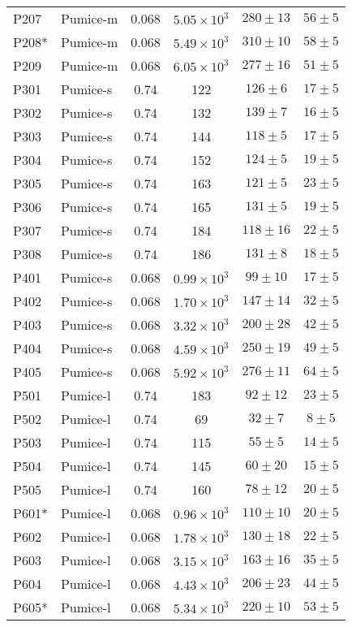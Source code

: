 \documentclass[3p,authoryear]{elsarticle}
\begin{document}
{\begin{longtable}[c]{ll|cccc}
	P207 & Pumice-m & 0.068 & $5.05 \times 10^3$ & $280 \pm 13$ & $56\pm 5$ \\
	P208*& Pumice-m & 0.068 & $5.49\times 10^3$ & $310\pm10$ & $58\pm5$\\
	P209 & Pumice-m & 0.068 &$6.05\times 10^3$ & $277\pm 16$ & $51\pm 5$ \\
	\hline
	P301& Pumice-s & 0.74 & 122 & $126\pm6$ & $17\pm5$\\
	P302& Pumice-s & 0.74 & 132 & $139\pm7$ & $16\pm5$\\
	P303& Pumice-s & 0.74 & 144 & $118\pm5$ & $17\pm5$\\
	P304& Pumice-s & 0.74 & 152 & $124\pm5$ & $19\pm5$ \\
	P305& Pumice-s & 0.74 & 163 & $121\pm5$ & $23\pm5$\\
	P306& Pumice-s & 0.74 & 165 & $131\pm5$ &  $19\pm5$\\
	P307& Pumice-s & 0.74 & 184 & $118\pm16$ & $22\pm5$\\
	P308& Pumice-s & 0.74 & 186 & $131\pm8$ & $18\pm5$\\
	P401&Pumice-s & 0.068 & $0.99\times 10^3$ & $99 \pm10$ & $17\pm5$\\
	P402& Pumice-s&0.068 & $1.70\times 10^3 $&$147\pm14$ & $32\pm 5$\\
	P403& Pumice-s&0.068 & $3.32\times 10^3$& $200\pm28$ & $42\pm5$\\
	P404& Pumice-s & 0.068 & $4.59\times 10^3$&$250\pm19$ & $49\pm 5$\\
	P405& Pumice-s & 0.068 & $5.92\times 10^3$ & $276\pm11$ & $64\pm5$\\
	\hline
	P501& Pumice-l & 0.74 & 183 & $92\pm 12$ &$23 \pm 5$\\
	P502& Pumice-l & 0.74 & 69 & $32\pm 7$ & $8\pm5$\\
	P503& Pumice-l & 0.74 & 115 & $55\pm 5$ & $14\pm 5$\\
	P504& Pumice-l & 0.74 & 145 & $60\pm20$ & $15\pm5$\\
	P505& Pumice-l & 0.74 & 160 & $78\pm12$ & $20\pm5$\\
	P601*&Pumice-l& 0.068 & $0.96\times 10^3$ &$110\pm10$& $20\pm5$\\
	P602&Pumice-l&0.068 & $1.78\times 10^3$ & $130\pm18$ & $22\pm5$\\
	P603&Pumice-l & 0.068 & $3.15\times 10^3$ & $163\pm 16$ &$35\pm5$\\
	P604& Pumice-l & 0.068 & $4.43\times 10^3$ & $206\pm 23$ & $44\pm5$\\
	P605*& Pumice-l & 0.068 & $5.34\times 10^3$ & $220\pm 10$ & $53\pm5$\\

\end{longtable}}
\end{document}
